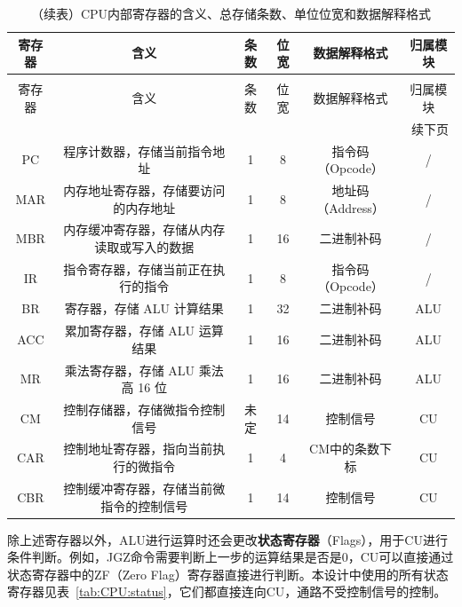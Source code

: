 \documentclass[lang=cn,a4paper,newtx]{elegantpaper}
\begin{document}
\begin{longtable}{c c c c c c}
  \caption{CPU内部寄存器的含义、总存储条数、单位位宽和数据解释格式} \label{tab:CPU:datawidth} \\
  \toprule
  寄存器 & 含义 & 条数 & 位宽 & 数据解释格式 & 归属模块\\
  \midrule
  \endfirsthead

  \caption[]{（续表）CPU内部寄存器的含义、总存储条数、单位位宽和数据解释格式} \\
  \toprule
  寄存器 & 含义 & 条数 & 位宽 & 数据解释格式 & 归属模块\\
  \midrule
  \endhead

  \midrule
  \multicolumn{6}{r}{续下页} \\
  \midrule
  \endfoot

  \bottomrule
  \endlastfoot

  PC   & 程序计数器，存储当前指令地址             & 1  & 8   & 指令码（Opcode） & /\\
  MAR  & 内存地址寄存器，存储要访问的内存地址     & 1  & 8   & 地址码（Address）& /\\
  MBR  & 内存缓冲寄存器，存储从内存读取或写入的数据 & 1  & 16  & 二进制补码 & /\\
  IR   & 指令寄存器，存储当前正在执行的指令       & 1  & 8   & 指令码（Opcode）& /\\
  BR   & 寄存器，存储 ALU 计算结果        & 1  & 32  & 二进制补码 & ALU\\
  ACC  & 累加寄存器，存储 ALU 运算结果           & 1  & 16  & 二进制补码 & ALU\\
  MR   & 乘法寄存器，存储 ALU 乘法高 16 位       & 1  & 16  & 二进制补码 & ALU\\
  CM   & 控制存储器，存储微指令控制信号         & 未定 & 14  & 控制信号 & CU\\
  CAR  & 控制地址寄存器，指向当前执行的微指令   & 1  & 4   & CM中的条数下标 & CU\\
  CBR  & 控制缓冲寄存器，存储当前微指令的控制信号 & 1  & 14  & 控制信号 & CU\\
\end{longtable}

除上述寄存器以外，ALU进行运算时还会更改\textbf{状态寄存器}（Flags），用于CU进行条件判断。例如，JGZ命令需要判断上一步的运算结果是否是0，CU可以直接通过状态寄存器中的ZF（Zero Flag）寄存器直接进行判断。本设计中使用的所有状态寄存器见表~\ref{tab:CPU:status}，它们都直接连向CU，通路不受控制信号的控制。
\end{document}
